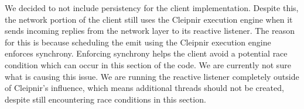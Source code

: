 We decided to not include persistency for the client implementation. Despite this, the network portion of the client still uses the Cleipnir execution engine when it sends incoming replies from the network layer to its reactive listener. The reason for this is because scheduling the emit using the Cleipnir execution engine enforces synchrony. Enforcing synchrony helps the client avoid a potential race condition which can occur in this section of the code. We are currently not sure what is causing this issue. We are running the reactive listener completely outside of Cleipnir's influence, which means additional threads should not be created, despite still encountering race conditions in this section.